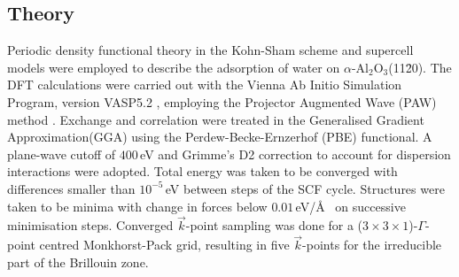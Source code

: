 \documentclass[twoside,twocolumn,9pt]{article}
\begin{document}
\subsection{Theory}\label{sec22}
Periodic density functional theory in the Kohn-Sham scheme and supercell 
models were employed to describe the adsorption of water on $\alpha$-Al$_{2}$O$_{3}$(11\=20). The DFT calculations were carried out with the Vienna Ab Initio Simulation Program, version VASP5.2 \cite{kresse1993,kresse2,kresse3,kresse4,kresse1999}, employing the Projector Augmented Wave (PAW) method \cite{paw1,paw2}. Exchange and correlation were treated in the Generalised Gradient Approximation(GGA) using the Perdew-Becke-Ernzerhof (PBE) functional\cite{pbe1,erratum}. A plane-wave cutoff of $400\,$eV and Grimme's D2 correction \cite{grimme06} to account for dispersion interactions were adopted. Total energy was taken to be converged with differences 
 smaller than $10^{-5}\,$eV between steps of the SCF cycle. Structures were taken to be minima with change in forces below $0.01\,$eV/\AA~ on successive minimisation steps. Converged $\vec{k}$-point sampling was done for a ($3\times3\times1$)-$\Gamma$-point centred Monkhorst-Pack grid\cite{monkhorst}, resulting in five $\vec{k}$-points for the irreducible part of the Brillouin zone.
\end{document}
